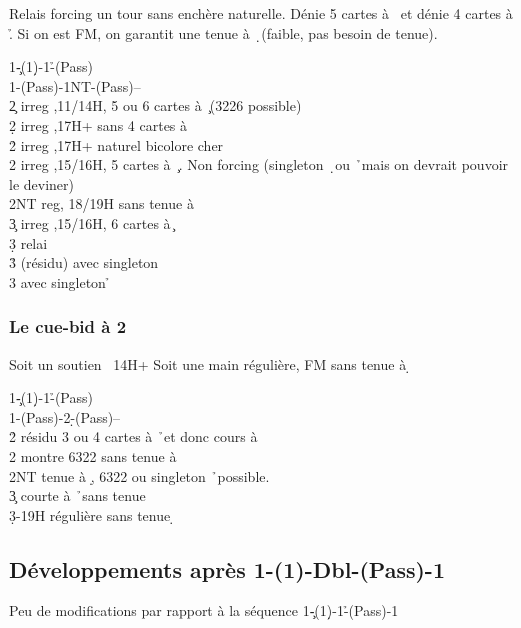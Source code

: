 \documentclass[a4paper]{article}
\begin{document}
Relais forcing un tour sans enchère naturelle. Dénie 5 cartes à \s\ et dénie 4 cartes à \h . 
Si on est FM, on garantit une tenue à \d\ (faible, pas besoin de tenue).

\begin{bidtable}
1\c-(1\d)-1\h-(Pass)\\
1\s-(Pass)-1NT-(Pass)--\\
2\c \> irreg ,11/14H, 5 ou 6 cartes à \c\ (3226 possible)\\
2\d \> irreg ,17H+ sans 4 cartes à \h \\
2\h \> irreg ,17H+ naturel bicolore cher\\
2\s \> irreg ,15/16H, 5 cartes à \c\ . Non forcing (singleton \d\ ou \h\ mais on devrait pouvoir le deviner)\\
2NT \> reg, 18/19H sans tenue à \d \\
3\c \> irreg ,15/16H, 6 cartes à \c \+\\
3\d \> relai\+\\
3\h \> (résidu) avec singleton \d \\
3\s \> avec singleton \h \-\-
\end{bidtable}

\subsubsection{Le cue-bid à 2 \pdfd}

Soit un soutien \s\ 14H+
Soit une main régulière, FM sans tenue à \d 

\begin{bidtable}
1\c-(1\d)-1\h-(Pass)\\
1\s-(Pass)-2\d-(Pass)--\\
2\h \> résidu 3 ou 4 cartes à \h\ et donc cours à \d \\
2\s \> montre 6322 sans tenue à \d \\
2NT \> tenue à \d , 6322 ou singleton \h\ possible.\\
3\c \> courte à \h\ sans tenue \d \\
3\d {}-19H régulière sans tenue \d 
\end{bidtable}

\subsection{Développements après 1\pdfc-(1\pdfh)-Dbl-(Pass)-1\pdfs}

Peu de modifications par rapport à la séquence
1\c -(1\d )-1\h -(Pass)-1\s 
\end{document}
